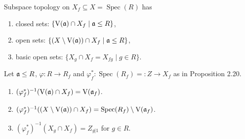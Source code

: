 \begin{corollary}
    Subspace topology on $X_f \subseteq X = \operatorname{Spec}(R)$ has 
    \begin{enumerate}
        \item closed sets: $\{\operatorname{V}(\mathfrak{a}) \cap X_f \mid \mathfrak{a} \leq R\}$,
        \item open sets: $\{(X \setminus \operatorname{V}(\mathfrak{a}))\cap X_f \mid \mathfrak{a} \leq R\}$,
        \item basic open sets: $\{X_g \cap X_f = X_{fg} \mid g \in R\}$.
    \end{enumerate}
\end{corollary}

\begin{proposition}
    Let $\mathfrak{a} \leq R$, $\varphi: R \to R_f$ and $\varphi_f^*: \operatorname{Spec}(R_f) =: Z \to X_f$ as in Proposition 2.20. 
    \begin{enumerate}
        \item 
            $(\varphi_f^*)^{-1}(\operatorname{V}(\mathfrak{a}) \cap X_f) = \operatorname{V}(\mathfrak{a}_f)$. 
        \item
            $(\varphi_f^*)^{-1}((X \setminus \operatorname{V}(\mathfrak{a})) \cap X_f) = \operatorname{Spec}(R_f) \setminus \operatorname{V}(\mathfrak{a}_f)$.
        \item 
            $(\varphi_f^*)^{-1}(X_g \cap X_f) = Z_{g|1}$ for $g \in R$.
    \end{enumerate}
\end{proposition}

